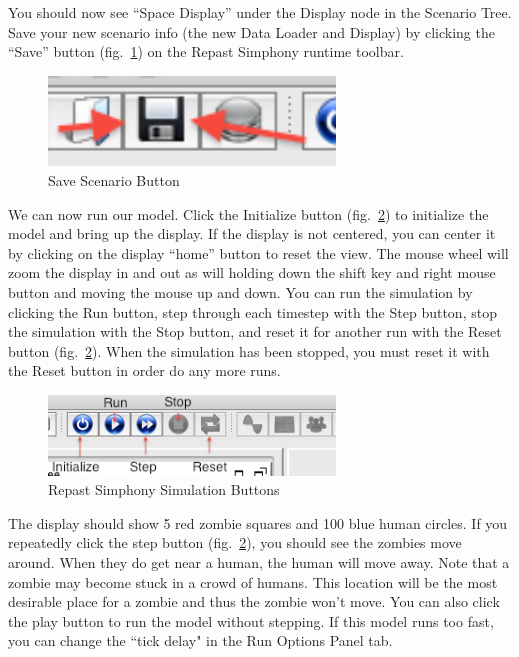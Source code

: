 \documentclass[11pt]{amsart}
\begin{document}
You should now see ``Space Display'' under the Display node in the Scenario Tree. Save your new scenario info (the new Data Loader and Display) by clicking the ``Save'' button (fig.~\ref{fig:save_button}) on the Repast Simphony runtime toolbar.

\begin{figure}[h]
\begin{center}
\vspace{.2in}
\centerline {
\includegraphics[width=3in]{GettingStartedImages/save_button.png}
}
\caption{Save Scenario Button}
\label{fig:save_button}
\end{center}
\end{figure}


We can now run our model. Click the Initialize button (fig.~\ref{fig:buttons}) to initialize the model and bring up the display. If the display is not centered, you can center it by clicking on the display ``home'' button to reset the view. The mouse wheel will zoom the display in and out as will holding down the shift key and right mouse button and moving the mouse up and down. You can run the simulation by clicking the Run button, step through each timestep with the Step button, stop the simulation with the Stop button, and reset it for another run with the Reset button (fig.~\ref{fig:buttons}). When the simulation has been stopped, you must reset it with the Reset button in order do any more runs.

\begin{figure}[h]
\begin{center}
\vspace{.2in}
\centerline {
\includegraphics[width=3in]{GettingStartedImages/buttons.png}
}
\caption{Repast Simphony Simulation Buttons}
\label{fig:buttons}
\end{center}
\end{figure}

The display should show 5 red zombie squares and 100 blue human circles. If you repeatedly click the step button  (fig.~\ref{fig:buttons}), you should see the zombies move around. When they do get near a human, the human will move away. Note that a zombie may become stuck in a crowd of humans. This location will be the most desirable place for a zombie and thus the zombie won't move. You can also click the play button to run the model without stepping. If this model runs too fast, you can change the ``tick delay" in the Run Options Panel tab.
\end{document}
